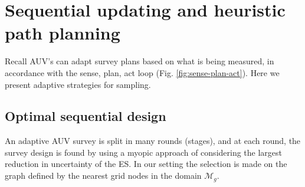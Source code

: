 \documentclass[aoas]{imsart}
\begin{document}






\section{Sequential updating and heuristic path planning}\label{sec:heuristics}

Recall AUV's can adapt survey plans based on what is being measured,
in accordance with the sense, plan, act loop
(Fig. \ref{fig:sense-plan-act}). Here we present adaptive strategies
for sampling.

\subsection{Optimal sequential design}
\label{myopic}

An adaptive AUV survey is split in many rounds (stages), and at each
round, the survey design is found by using a myopic approach of
considering the largest reduction in uncertainty of the ES. In our
setting the selection is made on the graph defined by the nearest grid
nodes in the domain $\mathcal{M}_g$.
\end{document}
